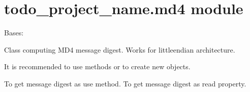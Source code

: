 \documentclass[letterpaper,10pt,english]{sphinxmanual}
\begin{document}
\section{todo\_project\_name.md4 module}
\label{\detokenize{todo_project_name:module-todo_project_name.md4}}\label{\detokenize{todo_project_name:todo-project-name-md4-module}}

\begin{fulllineitems}
\label{\detokenize{todo_project_name:todo_project_name.md4.MD4}}
\pysigstartsignatures
{}
\pysigstopsignatures
\sphinxAtStartPar
Bases: {\hyperref[\detokenize{todo_project_name:todo_project_name.mdn.MDN}]{}}

\sphinxAtStartPar
Class computing MD4 message digest. Works for little\sphinxhyphen{}endian architecture.

\sphinxAtStartPar
It is recommended to use methods  or 
to create new objects.

\sphinxAtStartPar
To get message digest as  use  method.
To get message digest as  read  property.

\begin{fulllineitems}
\label{\detokenize{todo_project_name:todo_project_name.md4.MD4.ROUND_2}}
\pysigstartsignatures
{}
\pysigstopsignatures
\end{fulllineitems}


\begin{fulllineitems}
\label{\detokenize{todo_project_name:todo_project_name.md4.MD4.ROUND_3}}
\pysigstartsignatures
{}
\pysigstopsignatures
\end{fulllineitems}


\end{fulllineitems}
\end{document}
